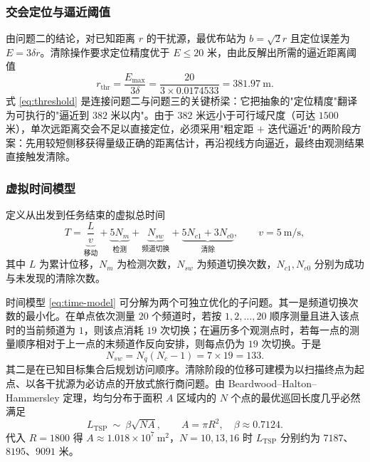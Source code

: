 \documentclass[12pt,a4paper]{ctexart}
\begin{document}
\subsubsection{交会定位与逼近阈值}

由问题二的结论，对已知距离 $r$ 的干扰源，最优布站为 $b=\sqrt2r$ 且定位误差为 $E=3\delta r$。清除操作要求定位精度优于 $E\le20$ 米，由此反解出所需的逼近距离阈值
\begin{equation}
r_{\mathrm{thr}}=\frac{E_{\max}}{3\delta}=\frac{20}{3\times0.0174533}=381.97\ \text{m}.
\label{eq:threshold}
\end{equation}
式 \eqref{eq:threshold} 是连接问题二与问题三的关键桥梁：它把抽象的"定位精度"翻译为可执行的"逼近到 $382$ 米以内"。由于 $382$ 米远小于可行域尺度（可达 $1500$ 米），单次远距离交会不足以直接定位，必须采用"粗定距 $+$ 迭代逼近"的两阶段方案：先用较短侧移获得量级正确的距离估计，再沿视线方向逼近，最终由观测结果直接触发清除。

\subsubsection{虚拟时间模型}

定义从出发到任务结束的虚拟总时间
\begin{equation}
T=\underbrace{\frac{L}{v}}_{\text{移动}}+\underbrace{5N_m}_{\text{检测}}
+\underbrace{N_{sw}}_{\text{频道切换}}
+\underbrace{5N_{c1}+3N_{c0}}_{\text{清除}},
\qquad v=5\ \text{m/s},
\label{eq:time-model}
\end{equation}
其中 $L$ 为累计位移，$N_m$ 为检测次数，$N_{sw}$ 为频道切换次数，$N_{c1},N_{c0}$ 分别为成功与未发现的清除次数。

时间模型 \eqref{eq:time-model} 可分解为两个可独立优化的子问题。其一是频道切换次数的最小化。在单点依次测量 $20$ 个频道时，若按 $1,2,\dots,20$ 顺序测量且进入该点时的当前频道为 $1$，则该点消耗 $19$ 次切换；在遍历多个观测点时，若每一点的测量顺序相对于上一点的末频道作反向安排，则每点仍为 $19$ 次切换。于是
\begin{equation}
N_{sw}=N_q(N_c-1)=7\times19=133 .
\label{eq:switch}
\end{equation}
其二是在已知目标集合后规划访问顺序。清除阶段的位移可建模为以扫描终点为起点、以各干扰源为必访点的开放式旅行商问题。由 Beardwood--Halton--Hammersley 定理，均匀分布于面积 $A$ 区域内的 $N$ 个点的最优巡回长度几乎必然满足
\begin{equation}
L_{\mathrm{TSP}}\ \sim\ \beta\sqrt{NA},\qquad A=\pi R^2,\quad \beta\approx0.7124 .
\label{eq:bhh}
\end{equation}
代入 $R=1800$ 得 $A\approx1.018\times10^7\ \text{m}^2$，$N=10,13,16$ 时 $L_{\mathrm{TSP}}$ 分别约为 $7187$、$8195$、$9091$ 米。
\end{document}
